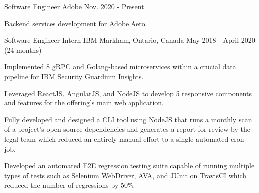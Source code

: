 


\begin{cventries}


\cventry
{Software Engineer} %
{Adobe} %
{} %
{Nov. 2020 - Present} %
{ %
\begin{cvitems}
\item {Backend services development for Adobe Aero.}
\end{cvitems}
}


\cventry
{Software Engineer Intern} %
{IBM} %
{Markham, Ontario, Canada} %
{May 2018 - April 2020 (24 months)} %
{ %
\begin{cvitems}
\item {Implemented 8 gRPC and Golang-based microservices within a crucial data pipeline for IBM Security Guardium Insights.}
\item {Leveraged ReactJS, AngularJS, and NodeJS to develop 5 responsive components and features for the offering's main web application.}
\item {Fully developed and designed a CLI tool using NodeJS that runs a monthly scan of a project's open source dependencies and generates a report for review by the legal team which reduced an entirely manual effort to a single automated cron job.}
\item {Developed an automated E2E regression testing suite capable of running multiple types of tests such as Selenium WebDriver, AVA, and JUnit on TravisCI which reduced the number of regressions by 50\%.}
\end{cvitems}
}


\end{cventries}